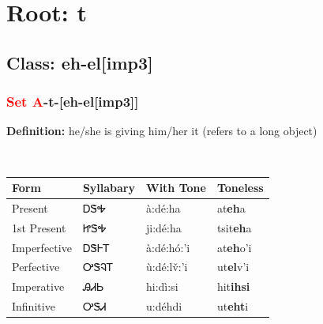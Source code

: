 \needspace{4in}
\section*{Root: t}
\nopagebreak
{}
\needspace{3in}
\subsection*{Class: eh-el[imp3]}
\nopagebreak
\needspace{2in}
\subsubsection*{\textcolor{Red}{Set A}{-}\textbf{t}{-}[eh-el[imp3]]}
\nopagebreak
\textbf{Definition: } he/she is giving him/her it (refers to a long object)
\\[0.5em]
\begin{tabularx}{\textwidth}{l X X X}%
\toprule%
\textbf{Form}&\textbf{Syllabary}&\textbf{With Tone}&\textbf{Toneless}\\%
\midrule%
Present&ᎠᏕᎭ&à:dé:ha&at\textbf{eh}a\\%
1st Present&ᏥᏕᎭ&ji:dé:ha&tsit\textbf{eh}a\\%
Imperfective&ᎠᏕᎰᎢ&à:dé:hó:’i&at\textbf{eh}o'i\\%
Perfective&ᎤᏕᎸᎢ&ù:dé:lv̌:’i&ut\textbf{el}v'i\\%
Imperative&ᎯᏗᏏ&hi:dì:si&hit\textbf{ihsi}\\%
Infinitive&ᎤᏕᏗ&u:déhdi&ut\textbf{eht}i\\%
\bottomrule%
\end{tabularx}
\\[1em]